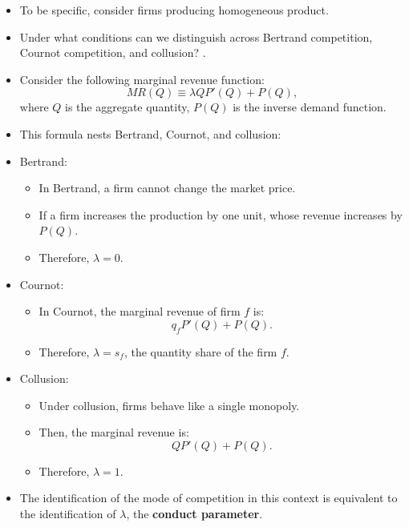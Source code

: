 \documentclass[
]{book}
\providecommand{\tightlist}{%
  \setlength{\itemsep}{0pt}\setlength{\parskip}{0pt}}
\begin{document}
\begin{itemize}
\tightlist
\item
  To be specific, consider firms producing homogeneous product.
\item
  Under what conditions can we distinguish across Bertrand competition, Cournot competition, and collusion? \citep{Bresnahan1982a}.
\item
  Consider the following marginal revenue function:
  \begin{equation}
  MR(Q) \equiv \lambda Q P'(Q) + P(Q),
  \end{equation}
  where \(Q\) is the aggregate quantity, \(P(Q)\) is the inverse demand function.
\item
  This formula nests Bertrand, Cournot, and collusion:
\item
  Bertrand:

  \begin{itemize}
  \tightlist
  \item
    In Bertrand, a firm cannot change the market price.
  \item
    If a firm increases the production by one unit, whose revenue increases by \(P(Q)\).
  \item
    Therefore, \(\lambda = 0\).
  \end{itemize}
\item
  Cournot:

  \begin{itemize}
  \tightlist
  \item
    In Cournot, the marginal revenue of firm \(f\) is:
    \[
      q_f P'(Q) + P(Q).
      \]
  \item
    Therefore, \(\lambda = s_f\), the quantity share of the firm \(f\).
  \end{itemize}
\item
  Collusion:

  \begin{itemize}
  \tightlist
  \item
    Under collusion, firms behave like a single monopoly.
  \item
    Then, the marginal revenue is:
    \[
      QP'(Q) + P(Q).
      \]
  \item
    Therefore, \(\lambda = 1\).
  \end{itemize}
\item
  The identification of the mode of competition in this context is equivalent to the identification of \(\lambda\), the \textbf{conduct parameter}.
\end{itemize}
\end{document}
